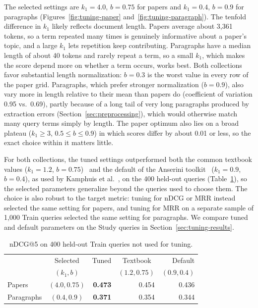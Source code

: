 \documentclass[sigconf,nonacm]{acmart}
\begin{document}
The selected settings are $k_1 = 4.0$, $b = 0.75$ for papers and $k_1 = 0.4$, $b = 0.9$ 
for paragraphs (Figures~\ref{fig:tuning-paper} and~\ref{fig:tuning-paragraph}). The tenfold 
difference in $k_1$ likely reflects document length. Papers average about 3,361 tokens, so a term 
repeated many times is genuinely informative about a paper's topic, and a large $k_1$ lets 
repetition keep contributing. Paragraphs have a median length of about 40 tokens and rarely repeat a term, 
so a small $k_1$, which makes the score depend more on whether a term occurs, works best. 
Both collections favor substantial length normalization: $b = 0.3$ is the worst value in 
every row of the paper grid. Paragraphs, which prefer stronger normalization ($b = 0.9$), also vary
more in length relative to their mean than papers do (coefficient of variation 0.95 vs.\ 0.69), 
partly because of a long tail of very long paragraphs produced by extraction errors 
(Section~\ref{sec:preprocessing}), which would otherwise match many query terms simply by 
length. The paper optimum also lies on a broad plateau ($k_1 \geq 3$, $0.5 \leq b \leq 0.9$) in 
which scores differ by about 0.01 or less, so the exact choice within it matters little.

For both collections, the tuned settings outperformed both the common
textbook values ($k_1 = 1.2$, $b = 0.75$)~\cite[Sec.~11.4.3]{manning2008irbook}
and the default of the Anserini toolkit~\cite{yang2017anserini}
($k_1 = 0.9$, $b = 0.4$), as used by Kamphuis et al.~\cite{kamphuis2020bm25},
on the 400 held-out queries (Table~\ref{tab:heldout}), so the selected
parameters generalize beyond the queries used to choose them. The choice is also robust to 
the target metric: tuning for nDCG or MRR instead selected the same setting for papers, and 
tuning for MRR on a separate sample of 1,000 Train queries selected the same setting for 
paragraphs. We compare tuned and default parameters on the Study queries in Section~\ref{sec:tuning-results}.

\begin{table}[t]
  \caption{nDCG@5 on 400 held-out Train queries not used for tuning.}
  \label{tab:heldout}
  \small
  \begin{tabular}{lcrrr}
    \toprule
    & Selected & Tuned & Textbook~\cite{manning2008irbook} & Default \\
    & $(k_1, b)$ & & $(1.2, 0.75)$ & $(0.9, 0.4)$ \\
    \midrule
    Papers     & $(4.0, 0.75)$ & \textbf{0.473} & 0.454 & 0.436 \\
    Paragraphs & $(0.4, 0.9)$  & \textbf{0.371} & 0.354 & 0.344 \\
    \bottomrule
  \end{tabular}
\end{table}
\end{document}
